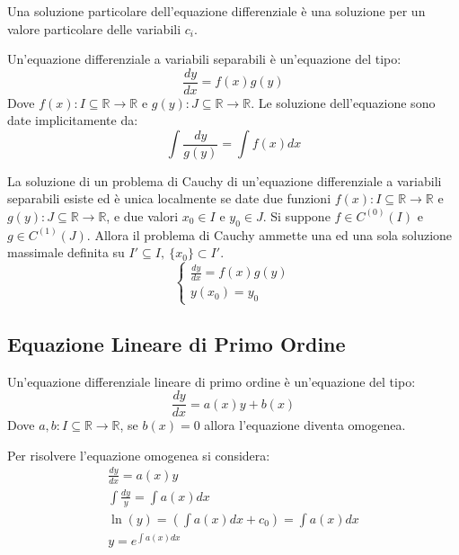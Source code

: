 \documentclass{article}
\numberwithin{equation}{subsection}
\begin{document}
Una soluzione particolare dell'equazione differenziale è una soluzione per un valore particolare delle variabili $c_i$. 


Un'equazione differenziale a variabili separabili è un'equazione del tipo:
\begin{equation}
    \displaystyle\frac{dy}{dx}=f(x)g(y)
\end{equation}
Dove $f(x):I\subseteq\mathbb{R}\to\mathbb{R}$ e $g(y):J\subseteq\mathbb{R}\to\mathbb{R}$. 
Le soluzione dell'equazione sono date implicitamente da:
\begin{equation}
    \displaystyle\int\frac{dy}{g(y)}=\int f(x)dx
\end{equation}


La soluzione di un problema di Cauchy di un'equazione differenziale a variabili separabili esiste ed è unica localmente se date due funzioni 
$f(x):I\subseteq\mathbb{R}\to\mathbb{R}$ e $g(y):J\subseteq\mathbb{R}\to\mathbb{R}$, e due valori $x_0\in I$ e $y_0\in J$. Si suppone $f\in C^{(0)}(I)$ e $g\in C^{(1)}(J)$. 
Allora il problema di Cauchy ammette una ed una sola soluzione massimale definita su $I'\subseteq I,\:\{x_0\}\subset I'$. 
\begin{equation}
    \begin{cases}
        \displaystyle\frac{dy}{dx}=f(x)g(y)\\
        y(x_0)=y_0
    \end{cases}
\end{equation}

\subsection{Equazione Lineare di Primo Ordine}

Un'equazione differenziale lineare di primo ordine è un'equazione del tipo:
\begin{equation}
    \displaystyle\frac{dy}{dx}=a(x)y+b(x)
\end{equation}
Dove $a,b:I\subseteq\mathbb{R}\to\mathbb{R}$, se $b(x)=0$ allora l'equazione diventa omogenea.

Per risolvere l'equazione omogenea si considera:
\begin{gather}
    \displaystyle\frac{dy}{dx}=a(x)y\\
    \displaystyle\int\frac{dy}{y}=\int a(x)dx\\
    \displaystyle \ln(y)=\left(\int a(x)dx+c_0\right)=\int a(x)dx\\
    y=\displaystyle e^{\int a(x)dx}
\end{gather}
\end{document}
